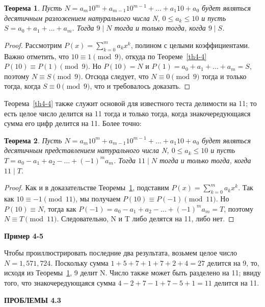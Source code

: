 \documentclass[11pt]{article}
\newtheorem{theorem}{Теорема}
\begin{document}
\begin{theorem}
	\label{th4-5}
Пусть $ N=a_{m}10^{m}+a_{m-1}10^{m-1}+\ldots+a_{1}10+a_{0} $ будет являться десятичным разложением натурального числа N, $ 0\leq a_{k}\leq 10 $ и пусть $ S=a_{0}+a_{1}+\ldots+a_{m} $. Тогда $ 9\mid N $ тогда и только тогда, когда $ 9\mid S $.
\end{theorem}

\begin{proof}
Рассмотрим $ P(x)=\sum_{k=0}^ma_{k}x^{k} $, полином с целыми коэффициентами. Важно отметить, что $ 10\equiv1 \pmod{9} $, откуда по Теореме~\ref{th4-4} $ P(10)\equiv P(1) \pmod{9} $. Но $ P(10)=N $ и $ P(1)=a_{0}+a_{1}+\ldots+a_{m}=S $, поэтому $ N\equiv S \pmod{9} $. Отсюда следует, что  $ N\equiv 0 \pmod{9} $ тогда и только тогда, когда  $ S\equiv 0 \pmod{9} $, что и требовалось доказать.
\end{proof}

Теорема~\ref{th4-4} также служит основой для известного теста делимости на 11; то есть целое число делится на 11 тогда и только тогда, когда знакочередующаяся сумма его цифр делится на 11. Более точно:

\begin{theorem}
	\label{th4-6}
Пусть $ N=a_{m}10^{m}+a_{m-1}10^{m-1}+\ldots+a_{1}10+a_{0} $ будет являться десятичным представлением натурального числа N, $ 0\leq a_{k}\leq 10 $ и пусть $ T=a_{0}-a_{1}+a_{2}-\ldots+(-1)^{m}a_{m} $. Тогда $ 11\mid N $ тогда и только тогда, когда $ 11\mid T $.
\end{theorem}

\begin{proof}
Как и в доказательстве Теоремы~\ref{th4-5}, подставим $ P(x)=\sum_{k=0}^ma_{k}x^{k} $. Так как  $ 10\equiv -1 \pmod{11} $, мы получаем $ P(10)\equiv P(-1) \pmod{11} $. Но  $ P(10)\equiv N $, тогда как  $ P(-1)=a_{0}-a_{1}+a_{2}-\ldots+(-1)^{m}a_{m}=T $, поэтому $ N\equiv T \pmod{11} $. Следовательно, N и T либо делятся на 11, либо нет.
\end{proof}

 \begin{flushleft}
\bf Пример 4-5
\end{flushleft}
Чтобы проиллюстрировать последние два результата, возьмем целое число $ N=1,571,724 $. Поскольку сумма $ 1+5+7+1+7+2+4=27 $ делится на 9, то, исходя из Теоремы~\ref{th4-5}, 9 делит N. Число также может быть разделено на 11; ввиду того, что знакочередующаяся сумма $ 4-2+7-1+7-5+1=11 $ делится на 11.

\begin{center}
	\LARGE {\textsf {\textbf {ПРОБЛЕМЫ 4.3}}}\\[5mm]
\end{center}
\end{document}
